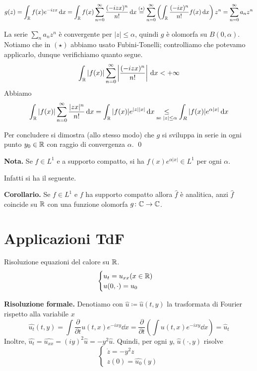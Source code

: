 %
$$
	g(z) = \int_\mathbb R f(x) e^{-izx} \,\mathrm{d} x 
	= \int_\mathbb R f(x) \sum_{n=0}^\infty \frac{(-izx)^n}{n!} \,\mathrm{d} x
	\overset{(\star)}{=} \sum_{n=0}^{\infty} \left( \int_\mathbb R \frac{(-ix)^n}{n!} f(x) \,\mathrm{d} x \right) z^n
	= \sum_{n=0}^\infty a_n z^n
$$
%

La serie $\sum_n a_n z^n$ è convergente per $|z| \leq \alpha$, quindi $g$ è olomorfa su $B(0,\alpha)$.
Notiamo che in $(\star)$ abbiamo usato Fubini-Tonelli; controlliamo che potevamo applicarlo, dunque verifichiamo quanto segue.
%
$$
	\int_{\mathbb R} |f(x)| \sum_{n=0}^{\infty} \left| \frac{(-izx)^n}{n!} \right| \,\mathrm{d} x < + \infty
$$
%
Abbiamo
%
$$
	\int_\mathbb R |f(x)| \sum_{n=0}^{\infty} \frac{|zx|^n}{n!} \,\mathrm{d} x
	= \int_\mathbb R |f(x)| e^{|z| |x|} \,\mathrm{d} x
	\underset{\text{se } |z| \leq \alpha}{\leq} \int_R |f(x)| e^{\alpha |x|} \,\mathrm{d} x
$$
%

Per concludere si dimostra (allo stesso modo) che $g$ si sviluppa in serie in ogni punto $y_0 \in \mathbb R$ con raggio di convergenza $\alpha$.
\qed

\vs


\textbf{Nota.} Se $f \in L^1$ e a supporto compatto, si ha $f(x) e^{\alpha |x|} \in L^1$ per ogni $\alpha$.

Infatti si ha il seguente.

\textbf{Corollario.} Se $f \in L^1$ e $f$ ha supporto compatto allora $\hat{f}$ è analitica, anzi $\hat{f}$ coincide su $\mathbb R$ con una funzione olomorfa $g \colon \mathbb C \to \mathbb C$.

\section{Applicazioni TdF}

Risoluzione equazioni del calore su $\mathbb R$.
%
$$
\begin{cases}
u_t = u_{xx} (x \in \mathbb R) \\
u(0,\cdot) = u_0
\end{cases} 
$$
%

\textbf{Risoluzione formale.}
Denotiamo con $\hat{u} \coloneqq \hat{u}(t,y)$ la trasformata di Fourier rispetto alla variabile $x$ 
%
$$
\hat{u_t}(t,y) = \int \frac{\partial}{\partial t} u(t,x) e^{-ixy} \dd x 
	= \frac{\partial}{\partial t} \left( \int u(t,x) e^{-ixy} \dd x \right) = \hat{u}_t
$$
%
Inoltre, $\hat{u_t} = \hat{u_{xx}} = (iy)^2 \hat{u} = -y^2\hat{u}$.
Quindi, per ogni $y$, $\hat{u}(\cdot,y)$ risolve
%
\begin{equation}
\label{eq:09dic_prob1}\tag{P}
\begin{cases}
	\dot z = -y^2 z \\
	z(0) = \hat{u_0}(y)
\end{cases} 
\end{equation}

